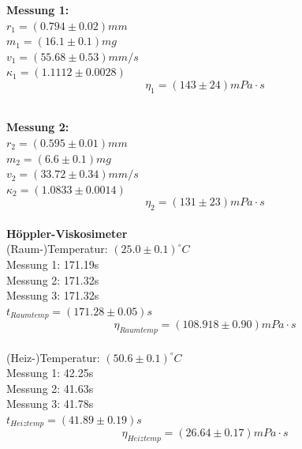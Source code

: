 \documentclass[12pt,a4paper]{article}
\begin{document}
\begin{multicols}{2}
\noindent



\textbf{Messung 1:}\\
$r_1 = (0.794 \pm 0.02) mm$\\
$m_1 = (16.1 \pm 0.1) mg$\\
$v_1 = (55.68 \pm 0.53)mm/s$\\
$\kappa_1 =  %
(1.1112\pm 0.0028)$\\
$$\eta_1 = %
(143 \pm 24) mPa \cdot s$$
\\
\noindent



\textbf{Messung 2:}\\
$r_2=(0.595 \pm 0.01)mm$\\
$m_2=(6.6 \pm 0.1)mg$\\
$v_2 = (33.72 \pm 0.34) mm/s$\\
$\kappa_2 = %
(1.0833 \pm 0.0014)$\\

$$\eta_2 = %
(131\pm 23) mPa\cdot s$$\\




\noindent
\textbf{Höppler-Viskosimeter}\\
(Raum-)Temperatur: $(25.0 \pm 0.1)^{\circ}C$\\
Messung 1: 171.19s\\
Messung 2: 171.32s\\
Messung 3: 171.32s\\
$t_{Raumtemp}= (171.28 \pm 0.05)s$\\
$$\eta_{Raumtemp}= (108.918\pm 0.90)mPa\cdot s$$
\\
(Heiz-)Temperatur: $(50.6\pm 0.1)^{\circ}C$\\
Messung 1: 42.25s\\
Messung 2: 41.63s\\
Messung 3: 41.78s\\
$t_{Heiztemp}= (41.89 \pm 0.19)s$\\
$$\eta_{Heiztemp}=(26.64\pm 0.17)mPa\cdot s$$


\end{multicols}
\end{document}
